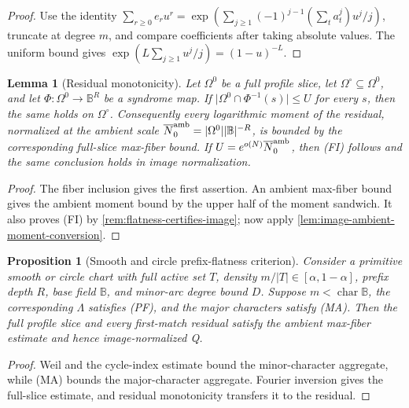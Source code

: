 \documentclass[12pt,a4paper]{amsart}
\numberwithin{equation}{section}
\newtheorem{proposition}[proposition]{Proposition}
\newtheorem{lemma}[lemma]{Lemma}
\theoremstyle{remark}
\newcommand{\B}{\mathbb B}
\newcommand{\Omc}{\Omega^{\circ}}
\newcommand{\barN}{\overline N}
\newcommand{\abs}[1]{\lvert #1\rvert}
\begin{document}
\begin{proof}
Use the identity \(\sum_{r\ge0}e_r u^r=\exp(\sum_{j\ge1}(-1)^{j-1}(\sum_ta_t^j)u^j/j)\), truncate at degree \(m\), and compare coefficients after taking absolute values.  The uniform bound gives \(\exp(L\sum_{j\ge1}u^j/j)=(1-u)^{-L}\).
\end{proof}

\begin{lemma}[Residual monotonicity]\label{lem:residual-monotonicity}
Let \(\Omega^0\) be a full profile slice, let \(\Omc\subseteq\Omega^0\),
and let \(\Phi:\Omega^0\to\B^R\) be a syndrome map.  If
\(\abs{\Omega^0\cap\Phi^{-1}(s)}\le U\) for every \(s\), then the same
holds on \(\Omc\).  Consequently every logarithmic moment of the residual,
normalized at the ambient scale
\(\barN_0^{\rm amb}=\abs{\Omega^0}\abs\B^{-R}\), is bounded by the
corresponding full-slice max-fiber bound.  If
\(U=e^{o(N)}\barN_0^{\rm amb}\), then \textup{(FI)} follows and the same
conclusion holds in image normalization.
\end{lemma}

\begin{proof}
The fiber inclusion gives the first assertion.  An ambient max-fiber bound
gives the ambient moment bound by the upper half of the moment sandwich.
It also proves \textup{(FI)} by \cref{rem:flatness-certifies-image}; now
apply \cref{lem:image-ambient-moment-conversion}.
\end{proof}

\begin{proposition}[Smooth and circle prefix-flatness criterion]\label{prop:smooth-circle-prefix-flatness-criterion}
Consider a primitive smooth or circle chart with full active set \(T\),
density \(m/\abs T\in[\alpha,1-\alpha]\), prefix depth \(R\), base field
\(\B\), and minor-arc degree bound \(D\).  Suppose
\(m<\operatorname{char}\B\), the corresponding \(\Lambda\) satisfies
\textup{(PF)}, and the major characters satisfy \textup{(MA)}.  Then the
full profile slice and every first-match residual satisfy the ambient
max-fiber estimate and hence image-normalized Q.
\end{proposition}

\begin{proof}
Weil and the cycle-index estimate bound the minor-character aggregate,
while \textup{(MA)} bounds the major-character aggregate.  Fourier
inversion gives the full-slice estimate, and residual monotonicity transfers
it to the residual.
\end{proof}
\end{document}
